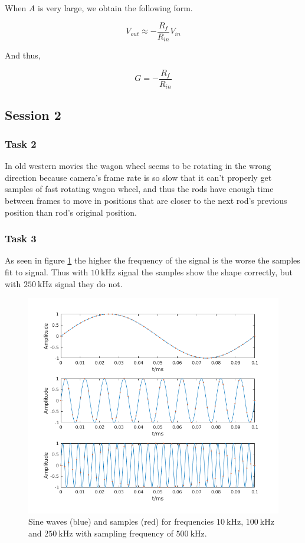 \documentclass[12pt]{article}
\begin{document}
When $A$ is very large, we obtain the following form.

\begin{equation*}
V_{out} \approx -\frac{R_f}{R_{in}} V_{in}
\end{equation*}

And thus,

\begin{equation}
G = -\frac{R_f}{R_{in}}
\label{eqn:G}
\end{equation}

\subsection{Session 2}

\subsubsection{Task 2}

In old western movies the wagon wheel seems to be rotating in the wrong direction because camera's frame rate is so slow that it can't properly get samples of fast rotating wagon wheel, and thus the rods have enough time between frames to move in positions that are closer to the next rod's previous position than rod's original position.

\subsubsection{Task 3}

As seen in figure \ref{fig:samp} the higher the frequency of the signal is the worse the samples fit to signal. Thus with $\SI{10}{\kilo\hertz}$ signal the samples show the shape correctly, but with $\SI{250}{\kilo\hertz}$ signal they do not.

\begin{figure}[!ht]
\centering
\includegraphics[width = \textwidth]{kuvat/sampling.png}
\caption{Sine waves (blue) and samples (red) for frequencies $\SI{10}{\kilo\hertz}$, $\SI{100}{\kilo\hertz}$ and $\SI{250}{\kilo\hertz}$ with sampling frequency of $\SI{500}{\kilo\hertz}$.}
\label{fig:samp}
\end{figure}
\end{document}
